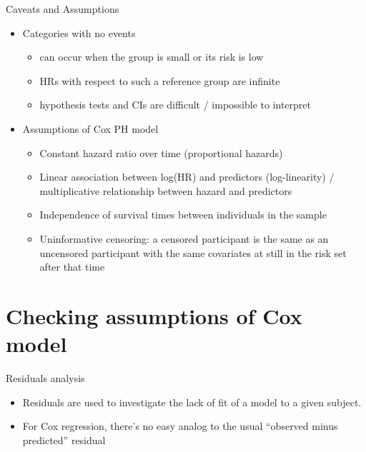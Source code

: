 \documentclass[
  ignorenonframetext,
]{beamer}
\providecommand{\tightlist}{%
  \setlength{\itemsep}{0pt}\setlength{\parskip}{0pt}}
\begin{document}
\begin{frame}{Caveats and Assumptions}
\protect\hypertarget{caveats-and-assumptions}{}

\begin{itemize}
\tightlist
\item
  Categories with no events

  \begin{itemize}
  \tightlist
  \item
    can occur when the group is small or its risk is low
  \item
    HRs with respect to such a reference group are infinite
  \item
    hypothesis tests and CIs are difficult / impossible to interpret
  \end{itemize}
\item
  Assumptions of Cox PH model

  \begin{itemize}
  \tightlist
  \item
    Constant hazard ratio over time (proportional hazards)
  \item
    Linear association between log(HR) and predictors (log-linearity) /
    multiplicative relationship between hazard and predictors
  \item
    Independence of survival times between individuals in the sample
  \item
    Uninformative censoring: a censored participant is the same as an
    uncensored participant with the same covariates at still in the risk
    set after that time
  \end{itemize}
\end{itemize}

\end{frame}

\hypertarget{checking-assumptions-of-cox-model}{%
\section{Checking assumptions of Cox
model}\label{checking-assumptions-of-cox-model}}

\begin{frame}{Residuals analysis}
\protect\hypertarget{residuals-analysis}{}

\begin{itemize}
\tightlist
\item
  Residuals are used to investigate the lack of fit of a model to a
  given subject.
\item
  For Cox regression, there's no easy analog to the usual ``observed
  minus predicted'' residual
\end{itemize}

\end{frame}
\end{document}
